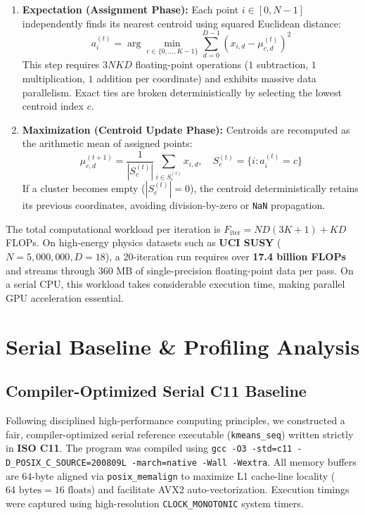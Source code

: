 \documentclass[sigconf,nonacm]{acmart}
\begin{document}
\begin{enumerate}
    \item \textbf{Expectation (Assignment Phase):} Each point $i \in [0, N-1]$ independently finds its nearest centroid using squared Euclidean distance:
    \begin{equation}
        a_i^{(t)} = \arg\min_{c \in \{0, \dots, K-1\}} \sum_{d=0}^{D-1} \left( x_{i,d} - \mu_{c,d}^{(t)} \right)^2
    \end{equation}
    This step requires $3NKD$ floating-point operations ($1$ subtraction, $1$ multiplication, $1$ addition per coordinate) and exhibits massive data parallelism. Exact ties are broken deterministically by selecting the lowest centroid index $c$.

    \item \textbf{Maximization (Centroid Update Phase):} Centroids are recomputed as the arithmetic mean of assigned points:
    \begin{equation}
        \mu_{c,d}^{(t+1)} = \frac{1}{|S_c^{(t)}|} \sum_{i \in S_c^{(t)}} x_{i,d}, \quad S_c^{(t)} = \{i : a_i^{(t)} = c\}
    \end{equation}
    If a cluster becomes empty ($|S_c^{(t)}| = 0$), the centroid deterministically retains its previous coordinates, avoiding division-by-zero or \texttt{NaN} propagation.
\end{enumerate}

The total computational workload per iteration is $F_{\text{iter}} = ND(3K + 1) + KD$ FLOPs. On high-energy physics datasets such as \textbf{UCI SUSY} ($N = 5{,}000{,}000, D = 18$), a 20-iteration run requires over \textbf{17.4 billion FLOPs} and streams through $360\text{ MB}$ of single-precision floating-point data per pass. On a serial CPU, this workload takes considerable execution time, making parallel GPU acceleration essential.

\section{Serial Baseline \& Profiling Analysis}

\subsection{Compiler-Optimized Serial C11 Baseline}
Following disciplined high-performance computing principles, we constructed a fair, compiler-optimized serial reference executable (\texttt{kmeans\_seq}) written strictly in \textbf{ISO C11}. The program was compiled using \texttt{gcc -O3 -std=c11 -D\_POSIX\_C\_SOURCE=200809L -march=native -Wall -Wextra}. All memory buffers are 64-byte aligned via \texttt{posix\_memalign} to maximize L1 cache-line locality ($64\text{ bytes} = 16\text{ floats}$) and facilitate AVX2 auto-vectorization. Execution timings were captured using high-resolution \texttt{CLOCK\_MONOTONIC} system timers.
\end{document}
